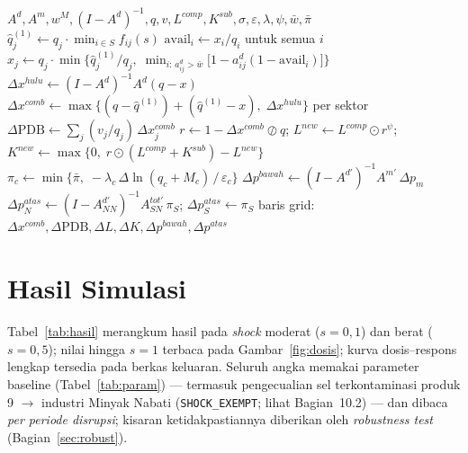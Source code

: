 \documentclass[11pt,a4paper]{article}
\newcommand{\en}[1]{\textit{#1}}   %
\begin{document}
\begin{algorithm}[ht]
\caption{Satu kombinasi skenario $(S, s)$}
\begin{algorithmic}[1]
\Require $A^d, A^m, w^M, (I-A^d)^{-1}, q, v, L^{comp}, K^{sub},
         \sigma, \varepsilon, \lambda, \psi, \bar w, \bar\pi$
\State $\hat q^{(1)}_j \gets q_j \cdot \min_{i\in S} f_{ij}(s)$
\Repeat {}
  \State $\text{avail}_i \gets x_i / q_i$ untuk semua $i$
  \State $x_j \gets q_j \cdot \min\bigl\{\hat q^{(1)}_j/q_j,\;
         \min_{i:\,a^d_{ij}>\bar w} \bigl[1 - a^d_{ij}(1-\text{avail}_i)\bigr]
         \bigr\}$ 
\State $\Delta x^{hulu} \gets (I-A^d)^{-1} A^d (q - x)$
\State $\Delta x^{comb} \gets \max\{(q-\hat q^{(1)}) + (\hat q^{(1)}-x),\;
       \Delta x^{hulu}\}$ per sektor 
\State $\Delta\text{PDB} \gets \sum_j (v_j/q_j)\,\Delta x^{comb}_j$
\State $r \gets 1 - \Delta x^{comb} \oslash q$;\quad
       $L^{new} \gets L^{comp} \odot r^{\psi}$;
\State $K^{new} \gets \max\{0,\; r\odot(L^{comp}{+}K^{sub}) - L^{new}\}$
 
  \State $\pi_c \gets \min\bigl\{\bar\pi,\;
         -\lambda_c\,\Delta\ln(q_c + M_c)\,/\,\varepsilon_c\bigr\}$
\EndFor
\State $\Delta p^{bawah} \gets (I - A^{d\prime})^{-1} A^{m\prime}\,
       \Delta p_m$ 
\State $\Delta p^{atas}_N \gets (I - A^{d\prime}_{NN})^{-1}
       A^{tot\prime}_{SN}\, \pi_S$; \quad $\Delta p^{atas}_S \gets \pi_S$
\State \Return baris grid: $\Delta x^{comb}, \Delta\text{PDB},
       \Delta L, \Delta K, \Delta p^{bawah}, \Delta p^{atas}$
\end{algorithmic}
\end{algorithm}

\section{Hasil Simulasi}
\label{sec:hasil}

Tabel~\ref{tab:hasil} merangkum hasil pada \en{shock} moderat
($s = 0{,}1$) dan berat ($s = 0{,}5$); nilai hingga $s = 1$ terbaca pada
Gambar~\ref{fig:dosis};
kurva dosis--respons lengkap tersedia pada berkas keluaran. Seluruh angka
memakai parameter baseline (Tabel~\ref{tab:param}) --- termasuk
pengecualian sel terkontaminasi produk 9 $\to$ industri Minyak Nabati
(\texttt{SHOCK\_EXEMPT}; lihat Bagian~10.2) --- dan dibaca \emph{per
periode disrupsi}; kisaran ketidakpastiannya diberikan oleh \en{robustness test}
(Bagian~\ref{sec:robust}).
\end{document}
